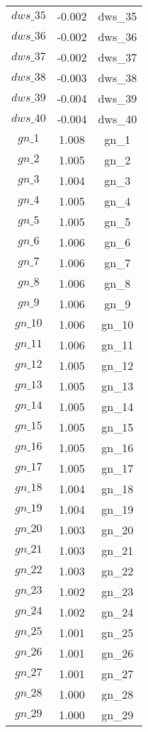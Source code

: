\begin{center}
\begin{longtable}{ccc}
$dws\_35$ 	 & 	 -0.002 	 & 	 dws\_35\\
$dws\_36$ 	 & 	 -0.002 	 & 	 dws\_36\\
$dws\_37$ 	 & 	 -0.002 	 & 	 dws\_37\\
$dws\_38$ 	 & 	 -0.003 	 & 	 dws\_38\\
$dws\_39$ 	 & 	 -0.004 	 & 	 dws\_39\\
$dws\_40$ 	 & 	 -0.004 	 & 	 dws\_40\\
$gn\_1$ 	 & 	 1.008 	 & 	 gn\_1\\
$gn\_2$ 	 & 	 1.005 	 & 	 gn\_2\\
$gn\_3$ 	 & 	 1.004 	 & 	 gn\_3\\
$gn\_4$ 	 & 	 1.005 	 & 	 gn\_4\\
$gn\_5$ 	 & 	 1.005 	 & 	 gn\_5\\
$gn\_6$ 	 & 	 1.006 	 & 	 gn\_6\\
$gn\_7$ 	 & 	 1.006 	 & 	 gn\_7\\
$gn\_8$ 	 & 	 1.006 	 & 	 gn\_8\\
$gn\_9$ 	 & 	 1.006 	 & 	 gn\_9\\
$gn\_10$ 	 & 	 1.006 	 & 	 gn\_10\\
$gn\_11$ 	 & 	 1.006 	 & 	 gn\_11\\
$gn\_12$ 	 & 	 1.005 	 & 	 gn\_12\\
$gn\_13$ 	 & 	 1.005 	 & 	 gn\_13\\
$gn\_14$ 	 & 	 1.005 	 & 	 gn\_14\\
$gn\_15$ 	 & 	 1.005 	 & 	 gn\_15\\
$gn\_16$ 	 & 	 1.005 	 & 	 gn\_16\\
$gn\_17$ 	 & 	 1.005 	 & 	 gn\_17\\
$gn\_18$ 	 & 	 1.004 	 & 	 gn\_18\\
$gn\_19$ 	 & 	 1.004 	 & 	 gn\_19\\
$gn\_20$ 	 & 	 1.003 	 & 	 gn\_20\\
$gn\_21$ 	 & 	 1.003 	 & 	 gn\_21\\
$gn\_22$ 	 & 	 1.003 	 & 	 gn\_22\\
$gn\_23$ 	 & 	 1.002 	 & 	 gn\_23\\
$gn\_24$ 	 & 	 1.002 	 & 	 gn\_24\\
$gn\_25$ 	 & 	 1.001 	 & 	 gn\_25\\
$gn\_26$ 	 & 	 1.001 	 & 	 gn\_26\\
$gn\_27$ 	 & 	 1.001 	 & 	 gn\_27\\
$gn\_28$ 	 & 	 1.000 	 & 	 gn\_28\\
$gn\_29$ 	 & 	 1.000 	 & 	 gn\_29\\

\end{longtable}
\end{center}
